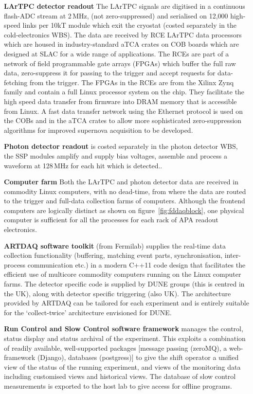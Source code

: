 {\bf LArTPC detector readout} The LArTPC signals are digitised in a
continuous flash-ADC stream at 2\,MHz, (not zero-suppressed) and
serialised on 12,000 high-speed links per 10kT module which exit the
cryostat (costed separately in the cold-electronics WBS).  The data
are received by RCE LArTPC data processors which are housed in
industry-standard aTCA crates on COB boards which are designed at SLAC
for a wide range of applications.  The RCEs are part of a network of
field programmable gate arrays (FPGAs) which buffer the full raw data,
zero-suppress it for passing to the trigger and accept requests for
data-fetching from the trigger.  The FPGAs in the RCEs are from the
Xilinx Zynq family and contain a full Linux processor system on the
chip.  They facilitate the high speed data transfer from firmware into
DRAM memory that is accessible from Linux.  A fast data transfer
network using the Ethernet protocol is used on the COBs and in the
aTCA crates to allow more sophisticated zero-suppression algorithms
for improved supernova acquisition to be developed.

{\bf Photon detector readout} is costed separately in the photon
detector WBS, the SSP modules amplify and supply bias voltages,
assemble and process a waveform at 128\,MHz for each hit which is
detected..

{\bf Computer farm} Both the LArTPC and photon detector data are
received in commodity Linux computers, with no dead-time, from where
the data are routed to the trigger and full-data collection farms of
computers.  Although the frontend computers are logically distinct as
shown on figure~\ref{fig:fddaqblock}, one physical computer is
sufficient for all the processes for each rack of APA readout
electronics.

{\bf ARTDAQ software toolkit} (from Fermilab) supplies the real-time
data collection functionality (buffering, matching event parts,
synchronisation, inter-process communication etc.) in a modern C++11
code design that facilitates the efficient use of multicore commodity
computers running on the Linux computer farms.  The detector specific
code is supplied by DUNE groups (this is centred in the UK), along
with detector specific triggering (also UK).  The architecture
provided by ARTDAQ can be tailored for each experiment and is entirely
suitable for the `collect-twice' architecture envisioned for DUNE.

{\bf Run Control and Slow Control software framework} manages the
control, status display and status archival of the experiment.  This
exploits a combination of readily available, well-supported packages
[message passing (zeroMQ), a web-framework (Django), databases
(postgress)] to give the shift operator a unified view of the status
of the running experiment, and views of the monitoring data including
customised views and historical views.  The database of slow control
measurements is exported to the host lab to give access for offline
programs.

